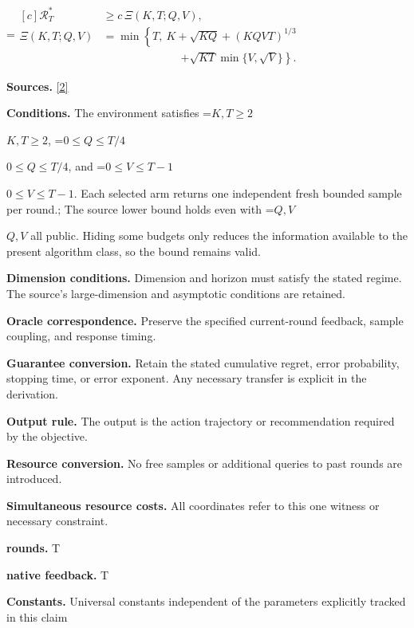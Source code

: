 \documentclass[10pt,a4paper]{article}
\newcommand{\AtlasMath}[1]{\par\begingroup\centering\setbox0=\hbox{$\displaystyle #1$}\ifdim\wd0>1.4\linewidth\typeout{ATLAS WIDE FORMULA: \the\wd0}\fi\ifdim\wd0>\linewidth\resizebox{\linewidth}{!}{\box0}\else\box0\fi\par\endgroup}
\newcommand{\AtlasInlineMath}[1]{\begingroup\setbox0=\hbox{$#1$}\ifdim\wd0>.4\linewidth\endgroup\AtlasMath{#1}\else\endgroup$#1$\fi}
\begin{document}
\AtlasMath{\begin{aligned}[c]\mathcal{R}_T^*&\ge c\,\Xi(K,T;Q,V),\\ \Xi(K,T;Q,V)&=\min\left\{T,\ K+\sqrt{KQ}+(KQVT)^{1/3}\right.\\ &\hspace{7em}\left.+\sqrt{KT}\min\{V,\sqrt V\}\right\}.\end{aligned}}


\textbf{Sources.} \href{https://arxiv.org/pdf/2610.26116}{[2]}



\textbf{Conditions.} The environment satisfies \AtlasInlineMath{K,T\ge2}, \AtlasInlineMath{0\le Q\le T/4}, and \AtlasInlineMath{0\le V\le T-1}. Each selected arm returns one independent fresh bounded sample per round.; The source lower bound holds even with \AtlasInlineMath{Q,V} all public. Hiding some budgets only reduces the information available to the present algorithm class, so the bound remains valid.



\textbf{Dimension conditions.} Dimension and horizon must satisfy the stated regime. The source's large-dimension and asymptotic conditions are retained.



\textbf{Oracle correspondence.} Preserve the specified current-round feedback, sample coupling, and response timing.



\textbf{Guarantee conversion.} Retain the stated cumulative regret, error probability, stopping time, or error exponent. Any necessary transfer is explicit in the derivation.



\textbf{Output rule.} The output is the action trajectory or recommendation required by the objective.



\textbf{Resource conversion.} No free samples or additional queries to past rounds are introduced.



\textbf{Simultaneous resource costs.} All coordinates refer to this one witness or necessary constraint.



\textbf{rounds.} T



\textbf{native feedback.} T



\textbf{Constants.} Universal constants independent of the parameters explicitly tracked in this claim
\end{document}
